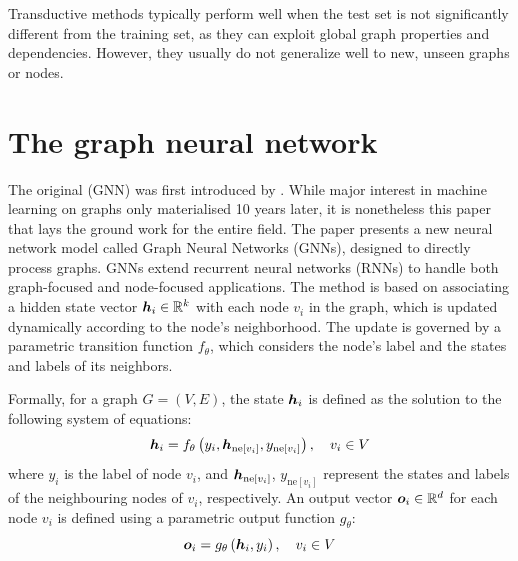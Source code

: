Transductive methods typically perform well when the test set is not significantly different from the training set, as they can exploit global graph properties and dependencies. However, they usually do not generalize well to new, unseen graphs or nodes.

\section{The graph neural network}

The original  (GNN) was first introduced by \cite{gori_new_2005}. While major interest in machine learning on graphs only materialised 10 years later, it is nonetheless this paper that lays the ground work for the entire field. The paper presents a new neural network model called Graph Neural Networks (GNNs), designed to directly process graphs. GNNs extend recurrent neural networks (RNNs) to handle both graph-focused and node-focused applications. The method is based on associating a hidden state vector \( \bm{h}_i \in \mathbb{R}^k \) with each node \( v_i \) in the graph, which is updated dynamically according to the node's neighborhood. The update is governed by a parametric transition function \( f_\theta \), which considers the node's label and the states and labels of its neighbors.

Formally, for a graph \( G = (V, E) \), the state \( \bm{h}_i \) is defined as the solution to the following system of equations:
\begin{equation}\label{eq:gori-state}
	\bm{h}_i = f_\theta \left( y_i, \bm{h}_{\mathrm{ne}[v_i]}, y_{\mathrm{ne}[v_i]} \right) , \quad v_i \in V
\end{equation}
where \( y_i \) is the label of node \( v_i \), and \( \bm{h}_{\mathrm{ne}[v_i]} \), \( y_{\mathrm{ne}[v_i]} \) represent the states and labels of the neighbouring nodes of \( v_i \), respectively. An output vector \( \bm{o}_i \in \mathbb{R}^d \) for each node \( v_i \) is defined using a parametric output function \( g_\theta \):
\begin{equation}\label{eq:gori-output}
	\bm{o}_i = g_\theta \left( \bm{h}_i, y_i \right) , \quad v_i \in V
\end{equation}

